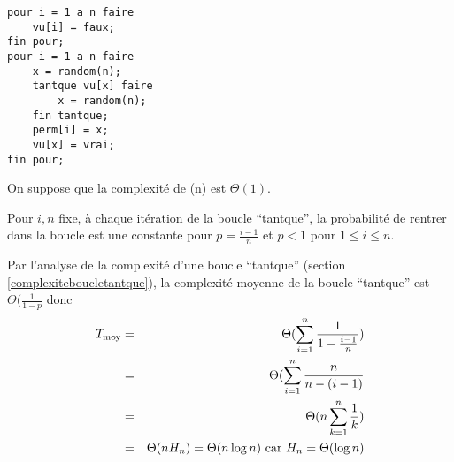 \begin{lstlisting}[language=algo, caption=Génération d'une permutation aléatoire]
pour i = 1 a n faire 
	vu[i] = faux;
fin pour;
pour i = 1 a n faire
	x = random(n);
	tantque vu[x] faire
		x = random(n);
	fin tantque;
	perm[i] = x;
	vu[x] = vrai;
fin pour;
\end{lstlisting}
On suppose que la complexité de \random(n) est $\Theta (1)$. 

Pour $i, n$ fixe, à chaque itération de la boucle ``tantque'', la probabilité de rentrer dans la boucle est une constante pour 
$p=\frac{i-1}{n}$ et $p < 1$ pour $1 \leq i \leq n$.

Par l'analyse de la complexité d'une boucle ``tantque'' (section \ref{complexiteboucletantque}), 
la complexité moyenne de la boucle ``tantque'' est $\Theta (\frac{1}{1-p}$ donc 
\begin{eqnarray*}
	T_{\moy} &=& \Theta(\sum^n_{i=1}\frac{1}{1-\frac{i-1}{n}})\\
	&=& \Theta(\sum^n_{i=1}\frac{n}{n-(i-1)}\\
	&=& \Theta(n\sum^n_{k=1}\frac{1}{k})\\
	&=&\Theta(n H_n)=\Theta(n\log n) \textrm{ car } H_n = \Theta(\log n)
\end{eqnarray*}


